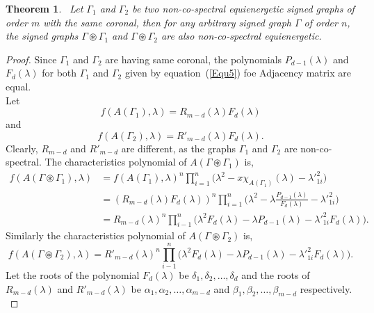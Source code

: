 \documentclass[12pt,a4paper]{article}
\newtheorem{theorem}{Theorem}[section]
\theoremstyle{definition}
\theoremstyle{remark}
\begin{document}
    \begin{theorem}~\label{TH3}
        Let $\Gamma_1$ and $\Gamma_2$ be two non-co-spectral equienergetic signed graphs of order $m$ with the same coronal, then for any arbitrary signed graph $\Gamma$ of order $n$, the signed graphs $\Gamma\circledast\Gamma_1$ and $\Gamma\circledast\Gamma_2$ are also non-co-spectral equienergetic.
    \end{theorem}
    \begin{proof}
        Since $\Gamma_1$ and $\Gamma_2$ are having same coronal, the polynomials $P_{d-1}(\lambda)$ and $F_d(\lambda)$ for both $\Gamma_1$ and $\Gamma_2$ given by equation~(\ref{Equ5}) foe Adjacency matrix are equal.\\
        Let \begin{equation}
                f(A(\Gamma_1),\lambda)=R_{m-d}(\lambda)F_d(\lambda)
        \end{equation}
        and\begin{equation}
                f(A(\Gamma_2),\lambda)=R'_{m-d}(\lambda)F_d(\lambda).
        \end{equation}
        Clearly, $R_{m-d}$ and $R'_{m-d}$ are different, as the graphs $\Gamma_1$ and $\Gamma_2$ are non-co-spectral. The characteristics polynomial of $A(\Gamma\circledast\Gamma_1)$ is,
        \begin{equation} \label{Eqn9}
            \begin{split}
                f(A(\Gamma\circledast\Gamma_1),\lambda) &=f(A(\Gamma_1),\lambda)^{n}\prod_{i=1}^{n}\big(\lambda^2-x\chi_{A(\Gamma_1)}(\lambda)-{\lambda'}_{1i}^2\big)\\
                &=(R_{m-d}(\lambda)F_d(\lambda))^n\prod_{i=1}^n\big(\lambda^2-\lambda\frac{P_{d-1}(\lambda)}{F_d(\lambda)}-{\lambda'}^2_{1i}\big)\\
                &=R_{m-d}(\lambda)^n\prod_{i-1}^n\big(\lambda^2F_d(\lambda)-\lambda P_{d-1}(\lambda)-{\lambda'}^2_{1i}F_d(\lambda)\big).
            \end{split}
        \end{equation}
        Similarly the characteristics polynomial of $A(\Gamma\circledast\Gamma_2)$ is,
        \begin{equation} \label{Eqn10}
            f(A(\Gamma\circledast\Gamma_2),\lambda)=R'_{m-d}(\lambda)^n\prod_{i-1}^n\big(\lambda^2F_d(\lambda)-\lambda P_{d-1}(\lambda)-{\lambda'}^2_{1i}F_d(\lambda)\big).
        \end{equation}
        Let the roots of the polynomial $F_d(\lambda)$ be $\delta_1,\delta_2,\ldots,\delta_d$ and the roots of $R_{m-d}(\lambda)$ and $R'_{m-d}(\lambda)$ be $\alpha_1,\alpha_2,\ldots,\alpha_{m-d}$ and $\beta_1,\beta_2,\ldots,\beta_{m-d}$ respectively.\\

\end{proof}
\end{document}

